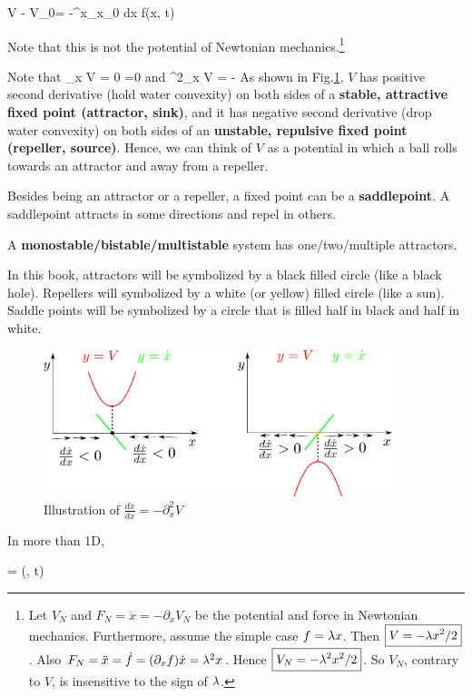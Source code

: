 \beq
V - V_0= -\int^x_{x_0} dx \; f(x, t)
\eeq

Note that this is not the potential of Newtonian mechanics.\footnote{Let $V_N$ and $F_N=\ddot{x}=-\partial_x V_N$ be the potential and force in
Newtonian mechanics. Furthermore,
assume the simple case $f=\lambda x$. Then $\boxed{V=-\lambda x^2/2}$. Also
$F_N= \ddot{x} =\dot{f}=(\partial_x f )
\dot{x}=
\lambda^2 x$. Hence $\boxed{V_N = -\lambda^2 x^2/2}$.
So $V_N$,
contrary to $V$, is insensitive to the sign of $\lambda$.
}



Note that
\beq
\partial_x V = 0 \iff {}=0
\eeq
and
\beq
\partial^2_x V = -
\eeq
As shown in Fig.\ref{fig-V-derivatives},
$V$ has positive second derivative
(hold water convexity)
on both sides of a {\bf stable, attractive fixed  point (attractor, sink)},
and it has negative second derivative
(drop water convexity)
on both sides of an {\bf unstable, repulsive fixed point (repeller, source)}. Hence, we can think of
$V$ as a potential in which a ball rolls towards an attractor
and away from a repeller.

Besides being an attractor or a repeller, a fixed point can be a
{\bf saddlepoint}. A saddlepoint
attracts in some directions and repel in others. 

A {\bf monostable/bistable/multistable}
system has one/two/multiple
attractors.

In this book, attractors will be symbolized by a black filled circle (like a black hole). Repellers will 
symbolized by a white (or yellow)  filled circle (like a sun).
Saddle points will be
symbolized by a circle that
is filled half in black
and half in white.


\begin{figure}[h!]
\centering
\includegraphics[width=4in]
{dynamical-sys/V-derivatives.png}
\caption{Illustration of
$\frac{d\dot{x}}{dx}=-\partial^2_xV$}
\label{fig-V-derivatives}
\end{figure}

In more than 1D, 

\beq
{} = (, t)
\eeq

